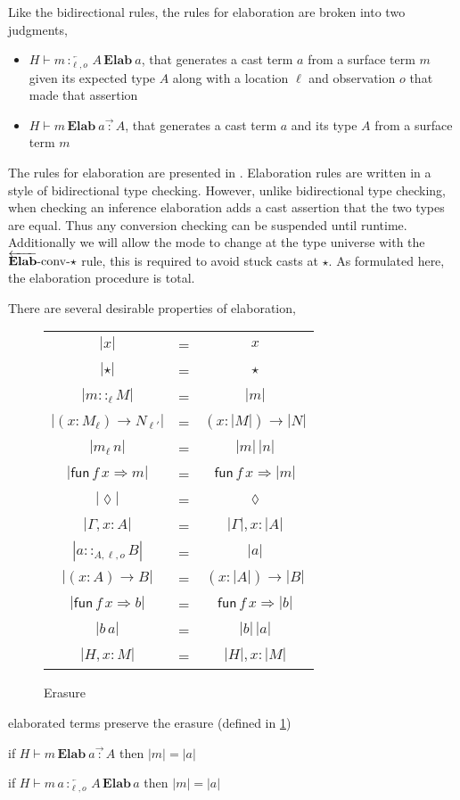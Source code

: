 Like the bidirectional rules, the rules for elaboration are broken into two judgments, 
\begin{itemize}
\item $H\vdash m\overleftarrow{\,:_{\ell,o}\,}A\,\textbf{Elab}\ a$, that generates a cast term $a$ from a surface term $m$ given its expected type $A$ along with a location $\ell$ and observation $o$ that made that assertion
\item $H\vdash m\,\textbf{Elab}\ a\overrightarrow{\,:\,}A$, that generates a cast term $a$ and its type $A$ from a surface term $m$
\end{itemize}
The rules for elaboration are presented in .
Elaboration rules are written in a style of bidirectional type checking.
However, unlike bidirectional type checking, when checking an inference elaboration adds a cast assertion that the two types are equal.
Thus any conversion checking can be suspended until runtime.
Additionally we will allow the mode to change at the type universe with the $\operatorname{\overleftarrow{\textbf{Elab}}-conv-\star}$ rule, this is required to avoid stuck casts at $\star$.
As formulated here, the elaboration procedure is total. 

There are several desirable properties of elaboration, 

\begin{figure}
\begin{tabular}{ccc}
$|x|$ & = & $x$\tabularnewline
$|\star|$ & = & $\star$\tabularnewline
$|m::_{\ell}M|$ & = & $|m|$\tabularnewline
$|\left(x:M_{\ensuremath{\ell}}\right)\rightarrow N_{\ensuremath{\ell'}}|$ & = & $\left(x:|M|\right)\rightarrow|N|$\tabularnewline
$|m_{\ensuremath{\ell}}\,n|$ & = & $|m|\,|n|$\tabularnewline
$|\mathsf{fun}\,f\,x\Rightarrow m|$ & = & $\mathsf{fun}\,f\,x\Rightarrow|m|$\tabularnewline
$|\lozenge|$ & = & $\lozenge$\tabularnewline
$|\Gamma,x:A|$ & = & $|\Gamma|,x:|A|$\tabularnewline
$|a::_{A,\ensuremath{\ell},o}B|$ & = & $|a|$\tabularnewline
$|\left(x:A\right)\rightarrow B|$ & = & $\left(x:|A|\right)\rightarrow|B|$\tabularnewline
$|\mathsf{fun}\,f\,x\Rightarrow b|$ & = & $\mathsf{fun}\,f\,x\Rightarrow|b|$\tabularnewline
$|b\,a|$ & = & $|b|\,|a|$\tabularnewline
$|H,x:M|$ & = & $|H|,x:|M|$\tabularnewline
\end{tabular}\caption{Erasure}
\label{fig:erasure}
\end{figure}

\begin{thm}
elaborated terms preserve the erasure (defined in \ref{fig:erasure})

if $H\vdash m\,\textbf{Elab}\ a\overrightarrow{\,:\,}A$ then $|m|=|a|$ 

if $H\vdash m\,a\overleftarrow{\,:_{\ensuremath{\ell},o}\,}A\,\textbf{Elab}\,a$
then $|m|=|a|$ 
\end{thm}

